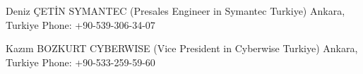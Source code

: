 

\begin{cventries}

  \cventry
    {Deniz ÇETİN} %
    {SYMANTEC (Presales Engineer in Symantec Turkiye)} %
    {Ankara, Turkiye} %
    {Phone: +90-539-306-34-07} %

  \cventry
    {Kazım BOZKURT} %
    {CYBERWISE (Vice President in Cyberwise Turkiye)} %
    {Ankara, Turkiye} %
    {Phone: +90-533-259-59-60} %
   

\end{cventries}
